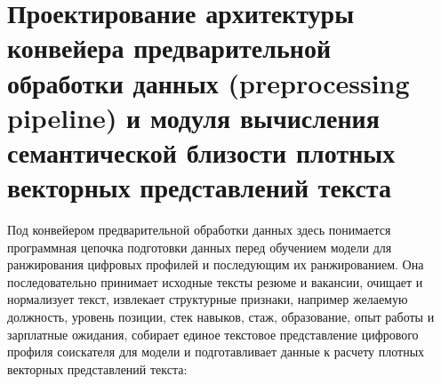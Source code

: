 \section{Проектирование архитектуры конвейера предварительной обработки данных (preprocessing pipeline) и модуля вычисления семантической близости плотных векторных представлений текста}

Под конвейером предварительной обработки данных здесь понимается программная цепочка подготовки данных перед обучением модели для ранжирования цифровых профилей и последующим их ранжированием. Она последовательно принимает исходные тексты резюме и вакансии, очищает и нормализует текст, извлекает структурные признаки, например желаемую должность, уровень позиции, стек навыков, стаж, образование, опыт работы и зарплатные ожидания, собирает единое текстовое представление цифрового профиля соискателя для модели и подготавливает данные к расчету плотных векторных представлений текста:

